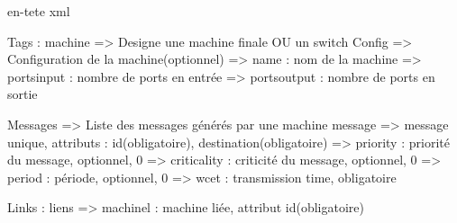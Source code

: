 en-tete xml


Tags :
machine => Designe une machine finale OU un switch
	Config => Configuration de la machine(optionnel)
		=> name : nom de la machine
		=> portsinput : nombre de ports en entrée
		=> portsoutput : nombre de ports en sortie

	Messages => Liste des messages générés par une machine
		message => message unique, attributs : id(obligatoire), destination(obligatoire)
			=> priority : priorité du message, optionnel, 0
			=> criticality : criticité du message, optionnel, 0
			=> period : période, optionnel, 0
			=> wcet : transmission time, obligatoire


	Links : liens
		=> machinel : machine liée, attribut id(obligatoire)


